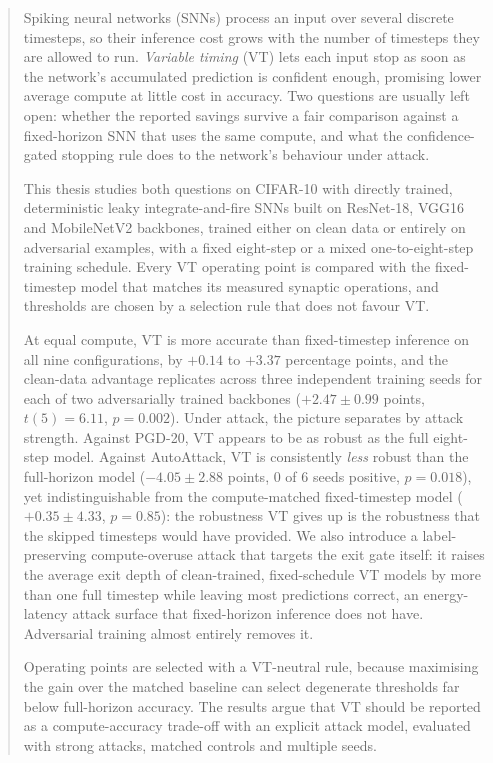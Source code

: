 \documentclass{iutbscthesis}
\begin{document}
\begin{abstract}
Spiking neural networks (SNNs) process an input over several discrete timesteps, so their inference cost grows with the number of timesteps they are allowed to run. \emph{Variable timing} (VT) lets each input stop as soon as the network's accumulated prediction is confident enough, promising lower average compute at little cost in accuracy. Two questions are usually left open: whether the reported savings survive a fair comparison against a fixed-horizon SNN that uses the same compute, and what the confidence-gated stopping rule does to the network's behaviour under attack.

This thesis studies both questions on CIFAR-10 with directly trained, deterministic leaky integrate-and-fire SNNs built on ResNet-18, VGG16 and MobileNetV2 backbones, trained either on clean data or entirely on adversarial examples, with a fixed eight-step or a mixed one-to-eight-step training schedule. Every VT operating point is compared with the fixed-timestep model that matches its measured synaptic operations, and thresholds are chosen by a selection rule that does not favour VT.

At equal compute, VT is more accurate than fixed-timestep inference on all nine configurations, by $+0.14$ to $+3.37$ percentage points, and the clean-data advantage replicates across three independent training seeds for each of two adversarially trained backbones ($+2.47 \pm 0.99$ points, $t(5) = 6.11$, $p = 0.002$). Under attack, the picture separates by attack strength. Against PGD-20, VT appears to be as robust as the full eight-step model. Against AutoAttack, VT is consistently \emph{less} robust than the full-horizon model ($-4.05 \pm 2.88$ points, 0 of 6 seeds positive, $p = 0.018$), yet indistinguishable from the compute-matched fixed-timestep model ($+0.35 \pm 4.33$, $p = 0.85$): the robustness VT gives up is the robustness that the skipped timesteps would have provided. We also introduce a label-preserving compute-overuse attack that targets the exit gate itself: it raises the average exit depth of clean-trained, fixed-schedule VT models by more than one full timestep while leaving most predictions correct, an energy-latency attack surface that fixed-horizon inference does not have. Adversarial training almost entirely removes it.

Operating points are selected with a VT-neutral rule, because maximising the gain over the matched baseline can select degenerate thresholds far below full-horizon accuracy. The results argue that VT should be reported as a compute-accuracy trade-off with an explicit attack model, evaluated with strong attacks, matched controls and multiple seeds.
\end{abstract}








\printbib

\begin{appendices}

\end{appendices}
\end{document}
